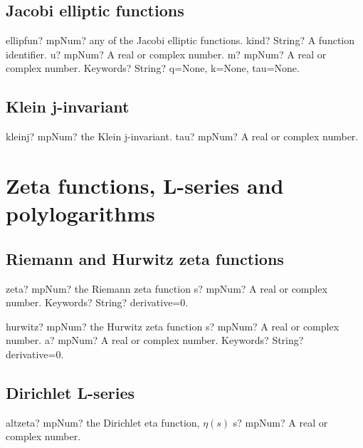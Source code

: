 \documentclass[12pt,a4paper,openany]{book}
\begin{document}
\section{Jacobi elliptic functions}

\begin{mpFunctionsExtract}
\mpFunctionFour
{ellipfun? mpNum? any of the Jacobi elliptic functions.}
{kind? String? A function identifier.}
{u? mpNum? A real or complex number.}
{m? mpNum? A real or complex number.}
{Keywords? String?  q=None, k=None, tau=None.}
\end{mpFunctionsExtract}

\section{Klein j-invariant}

\begin{mpFunctionsExtract}
\mpFunctionOne
{kleinj? mpNum? the Klein j-invariant.}
{tau? mpNum? A real or complex number.}
\end{mpFunctionsExtract}

\chapter{Zeta functions, L-series and polylogarithms}

\section{Riemann and Hurwitz zeta functions}

\begin{mpFunctionsExtract}
\mpFunctionTwo
{zeta? mpNum? the Riemann zeta function}
{s? mpNum? A real or complex number.}
{Keywords? String? derivative=0.}
\end{mpFunctionsExtract}

\begin{mpFunctionsExtract}
\mpFunctionThree
{hurwitz? mpNum? the  Hurwitz  zeta function}
{s? mpNum? A real or complex number.}
{a? mpNum? A real or complex number.}
{Keywords? String? derivative=0.}
\end{mpFunctionsExtract}

\section{Dirichlet L-series}

\begin{mpFunctionsExtract}
\mpFunctionOne
{altzeta? mpNum? the Dirichlet eta function, $\eta(s)$}
{s? mpNum? A real or complex number.}
\end{mpFunctionsExtract}
\end{document}
